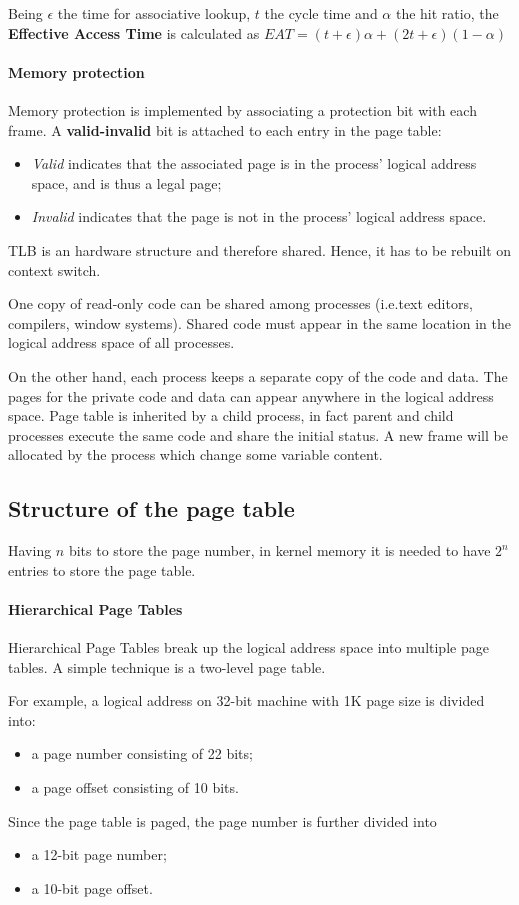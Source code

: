 Being $\epsilon$ the time for associative lookup, $t$  the cycle time and $\alpha$ the hit ratio, the \textbf{Effective Access Time} is calculated as $EAT = (t + \epsilon) \alpha + (2 t + \epsilon)(1 - \alpha)$

\paragraph{Memory protection} Memory protection is implemented by associating a protection bit with each frame. A \textbf{valid-invalid} bit is attached to each entry in the page table:
\begin{itemize}
\item \emph{Valid} indicates that the associated page is in the process' logical address space, and is thus a legal page;
\item \emph{Invalid} indicates that the page is not in the process' logical address space.
\end{itemize}
TLB is an hardware structure and therefore shared. Hence, it has to be rebuilt on context switch.

One copy of read-only code can be shared among processes (i.e.\@ text editors, compilers, window systems). Shared code must appear in the same location in the logical address space of all processes.

On the other hand, each process keeps a separate copy of the code and data. The pages for the private code and data can appear anywhere in the logical address space. Page table is inherited by a child process, in fact parent and child processes execute the same code and share the initial status. A new frame will be allocated by the process which change some variable content.

\subsection{Structure of the page table}
Having $n$ bits to store the page number, in kernel memory it is needed to have $2^n$ entries to store the page table.
\paragraph{Hierarchical Page Tables} Hierarchical Page Tables break up the logical address space into multiple page tables. A simple technique is a two-level page table.

For example, a logical address on 32-bit machine with 1K page size is divided into:
\begin{itemize}
\item a page number consisting of 22 bits;
\item a page offset consisting of 10 bits.
\end{itemize}
Since the page table is paged, the page number is further divided into
\begin{itemize}
\item a 12-bit page number;
\item a 10-bit page offset.
\end{itemize}

